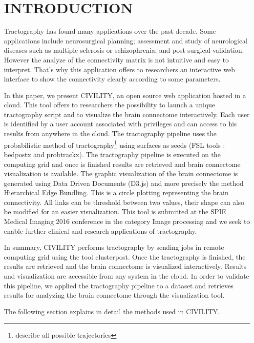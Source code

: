 \documentclass[]{spie}  %
\begin{document}
\section{INTRODUCTION}
\label{sec:intro}

Tractography has found many applications over the past decade. Some applications include neurosurgical planning; assessment and study of neurological diseases such as multiple sclerosis  or schizophrenia; and post-surgical validation. However the analyze of the connectivity matrix is not intuitive and easy to interpret. That's why this application offers to researchers an interactive web interface to show the connectivity clearly according to some parameters. 

In this paper, we present CIVILITY, an open source web application hosted in a cloud. This tool offers to researchers the possibility to launch a unique tractography script and to visualize the brain connectome interactively. Each user is identified by a user account associated with privileges and can access to his results from anywhere in the cloud.
The tractography pipeline uses the probabilistic method  of tractography\footnote{describe all possible trajectories} using surfaces as seeds (FSL tools : bedpostx and probtrackx). The tractography pipeline is executed on the computing grid and once is finished results are retrieved and brain connectome visualization is available. 
The graphic visualization of the brain connectome is generated using Data Driven Documents (D3.js) and more precisely the method Hierarchical Edge Bundling. This is a circle plotting representing the brain connectivity. All links can be threshold between two values, their shape can also be modified for an easier visualization. This tool is submitted at the SPIE Medical Imaging 2016 conference in the category Image processing and we seek to enable further clinical and research applications of tractography.

In summary, CIVILITY performs tractography by sending jobs in remote computing grid using the tool clusterpost. Once the tractography is finished, the results are retrieved and the brain connectome is visualized interactively. Results and visualization are accessible from any system in the cloud.
In order to validate this pipeline, we applied the tractography pipeline to a dataset and retrieves results for analyzing the brain connectome through the visualization tool.

The following section explains in detail the methods used in CIVILITY.
\end{document}

